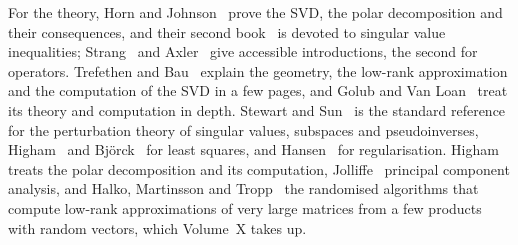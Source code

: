 For the theory, Horn and Johnson~\cite[Sects.~2.6, 7.3 and~7.4]{horn2013} prove the SVD, the polar decomposition and their consequences, and their second book~\cite[Chap.~3]{horn1991topics} is devoted to singular value inequalities; Strang~\cite{strang2016} and Axler~\cite[Chap.~7]{axler2024} give accessible introductions, the second for operators. Trefethen and Bau~\cite[Lectures~4, 5 and~31]{trefethen1997} explain the geometry, the low-rank approximation and the computation of the SVD in a few pages, and Golub and Van Loan~\cite[Sects.~2.4 and~8.6]{golub2013} treat its theory and computation in depth. Stewart and Sun~\cite{stewartsun1990} is the standard reference for the perturbation theory of singular values, subspaces and pseudoinverses, Higham~\cite[Chap.~20]{higham2002accuracy} and Bj\"orck~\cite{bjorck1996} for least squares, and Hansen~\cite{hansen1998} for regularisation. Higham~\cite[Chap.~8]{higham2008} treats the polar decomposition and its computation, Jolliffe~\cite{jolliffe2002} principal component analysis, and Halko, Martinsson and Tropp~\cite{halko2011} the randomised algorithms that compute low-rank approximations of very large matrices from a few products with random vectors, which Volume~X takes up.

\chapterreferences
